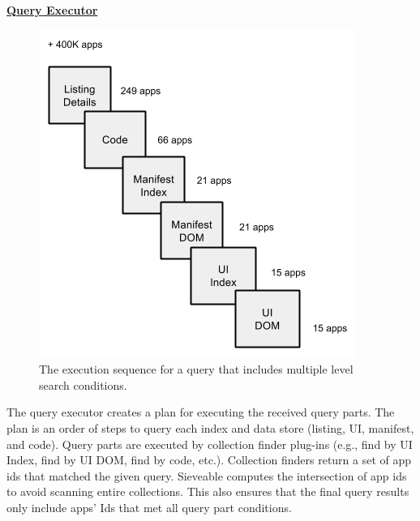 \underline{\textbf{Query Executor}}
\begin{figure}
	\centering
	\includegraphics[scale=0.5]{figures/sieveable-deep-search/queryExecution.png}
	\caption{The execution sequence for a query that includes multiple level search conditions.}
	\label{fig:fig_query_execution}
\end{figure}
The query executor creates a plan for executing the received query parts.
The plan is an order of steps to query each index and data store (listing, UI, manifest, and code).
Query parts are executed by collection finder plug-ins (e.g., find by UI Index, find by UI DOM, find by code, etc.).
Collection finders return a set of app ids that matched the given query.
Sieveable computes the intersection of app ids to avoid scanning entire collections.
This also ensures that the final query results only include apps' Ids that met all query part conditions.


